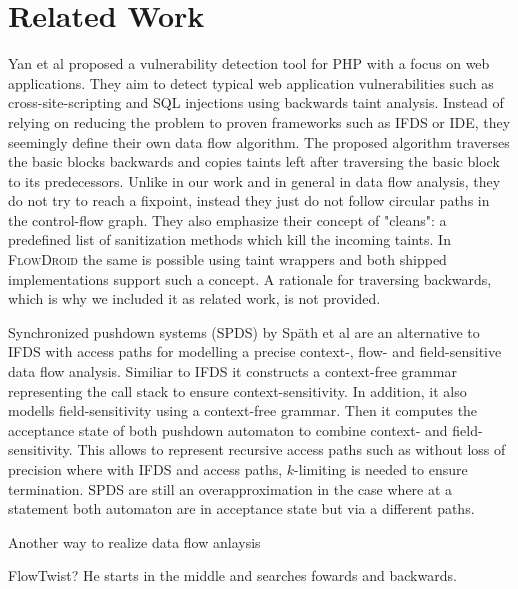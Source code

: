 \documentclass[../draft.tex]{subfiles}
\begin{document}
    \chapter{Related Work}
    Yan et al \cite{Yan2017} proposed a vulnerability detection tool for PHP with a focus on web applications. They aim to detect typical web application vulnerabilities such as cross-site-scripting and SQL injections using backwards taint analysis. 
    Instead of relying on reducing the problem to proven frameworks such as IFDS or IDE, they seemingly define their own data flow algorithm. The proposed algorithm traverses the basic blocks backwards and copies taints left after traversing the basic block to its predecessors. Unlike in our work and in general in data flow analysis, they do not try to reach a fixpoint, instead they just do not follow circular paths in the control-flow graph. 
    They also emphasize their concept of "cleans": a predefined list of sanitization methods which kill the incoming taints. 
    In \textsc{FlowDroid} the same is possible using taint wrappers and both shipped implementations support such a concept.
    A rationale for traversing backwards, which is why we included it as related work, is not provided.

    Synchronized pushdown systems (SPDS) by Späth et al \cite{Spaeth2019} are an alternative to IFDS with access paths for modelling a precise context-, flow- and field-sensitive data flow analysis. Similiar to IFDS it constructs a context-free grammar representing the call stack to ensure context-sensitivity. In addition, it also modells field-sensitivity using a context-free grammar. Then it computes the acceptance state of both pushdown automaton to combine context- and field-sensitivity. This allows to represent recursive access paths such as  without loss of precision where with IFDS and access paths, $k$-limiting is needed to ensure termination. SPDS are still an overapproximation in the case where at a statement both automaton are in acceptance state but via a different paths.

    Another way to realize data flow anlaysis

    FlowTwist? He starts in the middle and searches fowards and backwards.
\end{document}
